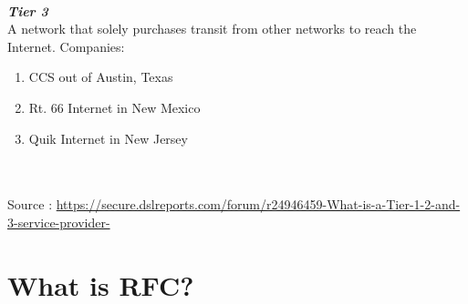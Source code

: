\documentclass[20pt]{article}
\begin{document}
\\\textbf{\emph{Tier 3}}
\\A network that solely purchases transit from other networks to reach the Internet.
Companies:
\begin{enumerate}
	\\\item{CCS out of Austin, Texas}
	\\\item{ Rt. 66 Internet in New Mexico }
	\\\item{Quik Internet in New Jersey }
\end{enumerate}
\\\\Source : 
\url{https://secure.dslreports.com/forum/r24946459-What-is-a-Tier-1-2-and-3-service-provider-}
\section{What is RFC?}
\end{document}
